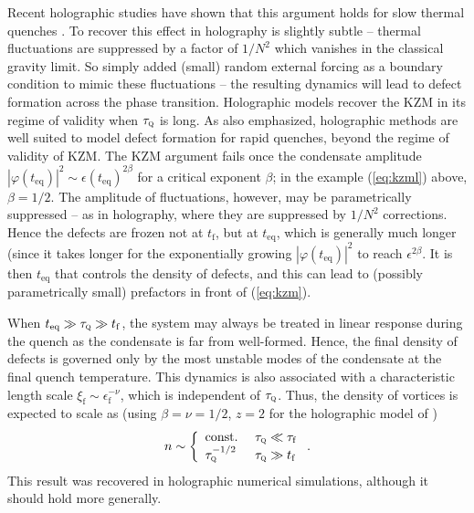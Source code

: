 \documentclass[10pt, oneside]{book}
\begin{document}
\begin{doublespace}
Recent holographic studies have shown that this  argument holds for slow thermal quenches \cite{Sonner:2014tca, Chesler:2014gya}.   To recover this effect in holography is slightly subtle -- thermal fluctuations are suppressed by a factor of $1/N^2$ which vanishes in the classical gravity limit.  So \cite{Sonner:2014tca, Chesler:2014gya} simply added (small) random external forcing as a boundary condition to mimic these fluctuations -- the resulting dynamics will lead to defect formation across the phase transition.   
Holographic models recover the KZM in its regime of validity when $\tau_{\textsc{q}}$ is long.   As \cite{Chesler:2014gya} also emphasized,  holographic methods are well suited to model defect formation for rapid quenches, beyond the regime of validity of KZM.    The KZM argument fails once the condensate amplitude $|\varphi(t_{\mathrm{eq}})|^2 \sim \epsilon(t_{\mathrm{eq}})^{2\beta}$ for a critical exponent $\beta$;  in the example (\ref{eq:kzml}) above, $\beta=1/2$.   The amplitude of fluctuations, however, may be parametrically suppressed -- as in holography, where they are suppressed by $1/N^2$ corrections.   Hence the defects are frozen not at $t_{\mathrm{f}}$, but at $t_{\mathrm{eq}}$, which is generally much longer (since it takes longer for the exponentially growing $|\varphi(t_{\mathrm{eq}})|^2 $ to reach $\epsilon^{2\beta}$.   It is then $t_{\mathrm{eq}}$ that controls the density of defects, and this can lead to (possibly parametrically small) prefactors in front of (\ref{eq:kzm}).   

When $t_{\mathrm{eq}} \gg \tau_{\textsc{q}} \gg t_{\mathrm{f}}$, the system may always be treated in linear response during the quench as the condensate is far from well-formed.   Hence, the final density of defects is governed only by the most unstable modes of the condensate at the final quench temperature.   This dynamics is also  associated with a characteristic length scale $\xi_{\mathrm{f}} \sim \epsilon_{\mathrm{f}}^{-\nu}$, which is independent of $\tau_{\textsc{q}}$.   Thus, the density of vortices is expected to scale as (using $\beta=\nu=1/2$, $z=2$ for the holographic model of \cite{Chesler:2014gya}) \begin{equation}
n \sim \left\lbrace\begin{array}{ll} \text{const.} &\ \tau_{\textsc{q}} \ll \tau_{\mathrm{f}} \\ \tau_{\textsc{q}}^{-1/2} &\ \tau_{\textsc{q}} \gg t_{\mathrm{f}}  \end{array}\right..
\end{equation}
This result was  recovered in holographic numerical simulations, although it should hold more generally.  


\end{doublespace}
\end{document}
